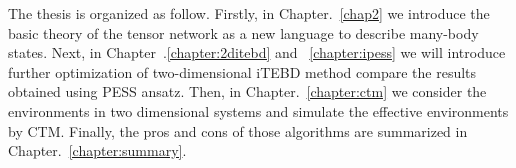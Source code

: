 The thesis is organized as follow. Firstly, in Chapter.~\ref{chap2} we introduce the basic theory of the tensor network as a new language to describe many-body states. Next, in Chapter~.\ref{chapter:2ditebd} and ~\ref{chapter:ipess} we will introduce further optimization of two-dimensional iTEBD method compare the results obtained using PESS ansatz. Then, in Chapter.~\ref{chapter:ctm} we consider the environments in two dimensional systems and simulate the effective environments by CTM. Finally, the pros and cons of those algorithms are summarized in Chapter.~\ref{chapter:summary}.

